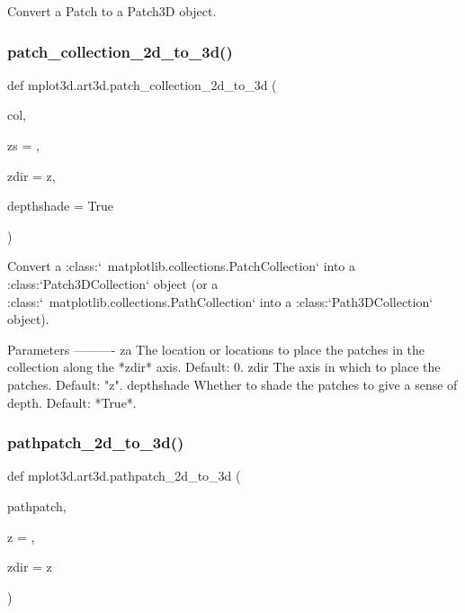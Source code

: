 \begin{DoxyVerb}Convert a Patch to a Patch3D object.\end{DoxyVerb}
 \mbox{\label{namespacemplot3d_1_1art3d_adda6f5823961c62812d0ac5dedabf63e}} 
\subsubsection{\texorpdfstring{patch\+\_\+collection\+\_\+2d\+\_\+to\+\_\+3d()}{patch\_collection\_2d\_to\_3d()}}
{\footnotesize\ttfamily def mplot3d.\+art3d.\+patch\+\_\+collection\+\_\+2d\+\_\+to\+\_\+3d (\begin{DoxyParamCaption}\item[{}]{col,  }\item[{}]{zs = {},  }\item[{}]{zdir = {\ttfamily \textquotesingle{}z\textquotesingle{}},  }\item[{}]{depthshade = {\ttfamily True} }\end{DoxyParamCaption})}

\begin{DoxyVerb}Convert a :class:`~matplotlib.collections.PatchCollection` into a
:class:`Patch3DCollection` object
(or a :class:`~matplotlib.collections.PathCollection` into a
:class:`Path3DCollection` object).

Parameters
----------
za
    The location or locations to place the patches in the collection along
    the *zdir* axis. Default: 0.
zdir
    The axis in which to place the patches. Default: "z".
depthshade
    Whether to shade the patches to give a sense of depth. Default: *True*.\end{DoxyVerb}
 \mbox{\label{namespacemplot3d_1_1art3d_a7535eb7d41ebf54ac9eb7d90c1412c3a}} 
\subsubsection{\texorpdfstring{pathpatch\+\_\+2d\+\_\+to\+\_\+3d()}{pathpatch\_2d\_to\_3d()}}
{\footnotesize\ttfamily def mplot3d.\+art3d.\+pathpatch\+\_\+2d\+\_\+to\+\_\+3d (\begin{DoxyParamCaption}\item[{}]{pathpatch,  }\item[{}]{z = {},  }\item[{}]{zdir = {\ttfamily \textquotesingle{}z\textquotesingle{}} }\end{DoxyParamCaption})}

